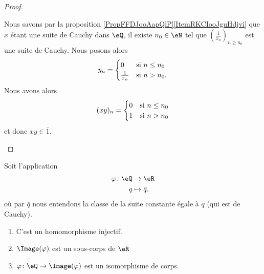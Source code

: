 \begin{proof}
\begin{subproof}
        Nous savons par la proposition \ref{PropFFDJooAapQlP}\ref{ItemRKCIooJguHdjvi} que \( x\) étant une suite de Cauchy dans \( \eQ\), il existe \( n_0\in \eN\) tel que \( \left( \frac{1}{ x_n } \right)_{n\geq n_0}\) est une suite de Cauchy. Nous posons alors
        \begin{equation}
            y_n=\begin{cases}
                0    &   \text{si \( n\leq n_0\)}\\
                \frac{1}{ x_n }    &    \text{si \( n>n_0\)}.
            \end{cases}
        \end{equation}
        Nous avons alors
        \begin{equation}
            (xy)_n=\begin{cases}
                0    &   \text{si \( n\leq n_0\)}\\
                1    &    \text{si \( n>n_0\)}
            \end{cases}
        \end{equation}
        et donc \( xy\in\bar 1\).
    \end{subproof}
\end{proof}

\begin{proposition}     \label{PropooEPFCooMtDOfP}
    Soit l'application
    \begin{equation}
        \begin{aligned}
            \varphi\colon \eQ&\to \eR \\
            q&\mapsto \bar q .
        \end{aligned}
    \end{equation}
    où par \( \bar q\) nous entendons la classe de la suite constante égale à \( q\) (qui est de Cauchy).
    \begin{enumerate}
        \item
            C'est un homomorphisme injectif.
        \item
            \( \Image(\varphi)\) est un sous-corps de \( \eR\)
        \item
            \( \varphi\colon \eQ\to \Image(\varphi)\) est un isomorphisme de corps.
    \end{enumerate}
\end{proposition}

